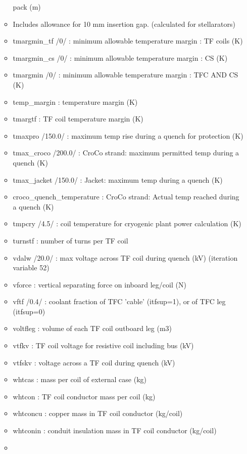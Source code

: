 \documentclass[
]{article}
\begin{document}
\begin{itemize}
\begin{itemize}
    pack (m)
  \item
    Includes allowance for 10 mm insertion gap. (calculated for
    stellarators)
  \item
    tmargmin\_tf /0/ : minimum allowable temperature margin : TF coils
    (K)
  \item
    tmargmin\_cs /0/ : minimum allowable temperature margin : CS (K)
  \item
    tmargmin /0/ : minimum allowable temperature margin : TFC AND CS (K)
  \item
    temp\_margin : temperature margin (K)
  \item
    tmargtf : TF coil temperature margin (K)
  \item
    tmaxpro /150.0/ : maximum temp rise during a quench for protection
    (K)
  \item
    tmax\_croco /200.0/ : CroCo strand: maximum permitted temp during a
    quench (K)
  \item
    tmax\_jacket /150.0/ : Jacket: maximum temp during a quench (K)
  \item
    croco\_quench\_temperature : CroCo strand: Actual temp reached
    during a quench (K)
  \item
    tmpcry /4.5/ : coil temperature for cryogenic plant power
    calculation (K)
  \item
    turnstf : number of turns per TF coil
  \item
    vdalw /20.0/ : max voltage across TF coil during quench (kV)
    (iteration variable 52)
  \item
    vforce : vertical separating force on inboard leg/coil (N)
  \item
    vftf /0.4/ : coolant fraction of TFC 'cable' (itfsup=1), or of TFC
    leg (itfsup=0)
  \item
    voltfleg : volume of each TF coil outboard leg (m3)
  \item
    vtfkv : TF coil voltage for resistive coil including bus (kV)
  \item
    vtfskv : voltage across a TF coil during quench (kV)
  \item
    whtcas : mass per coil of external case (kg)
  \item
    whtcon : TF coil conductor mass per coil (kg)
  \item
    whtconcu : copper mass in TF coil conductor (kg/coil)
  \item
    whtconin : conduit insulation mass in TF coil conductor (kg/coil)
  \item

\end{itemize}
\end{itemize}
\end{document}
